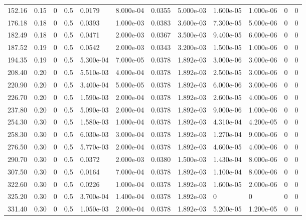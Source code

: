 \documentclass[preview]{standalone}
\begin{document}
{{\begin{tabular}{L{1.2cm}C{1.2cm} C{0.3cm}C{0.5cm} C{1.4cm}C{1.4cm} C{1.4cm}C{1.4cm} C{1.6cm}C{1.6cm} C{1.6cm}C{1.6cm}}
  152.16  &  0.15  & 0     & 0.5 &  0.0179  & 8.000e-04  &  0.0355&   5.000e-03& 1.600e-05 & 1.000e-06   &  0 & 0  \\ 
  176.18  &  0.18  & 0     & 0.5 &  0.0393  & 1.000e-03  &  0.0383&   3.600e-03& 7.300e-05 & 5.000e-06   &  0 & 0  \\ 
  182.49  &  0.18  & 0     & 0.5 &  0.0471  & 2.000e-03  &  0.0367&   3.500e-03& 9.400e-05 & 6.000e-06   &  0 & 0  \\ 
  187.52  &  0.19  & 0     & 0.5 &  0.0542  & 2.000e-03  &  0.0343&   3.200e-03& 1.500e-05 & 1.000e-06   &  0 & 0  \\ 
  194.35  &  0.19  & 0     & 0.5 &  5.300e-04  & 7.000e-05  &  0.0378&   1.892e-03& 3.000e-06 & 3.000e-06   &  0 & 0  \\ 
  208.40  &  0.20  & 0     & 0.5 &  5.510e-03  & 4.000e-04  &  0.0378&   1.892e-03& 2.500e-05 & 3.000e-06   &  0 & 0  \\ 
  220.90  &  0.20  & 0     & 0.5 &  3.400e-04  & 5.000e-05  &  0.0378&   1.892e-03& 6.000e-06 & 3.000e-06   &  0 & 0  \\ 
  226.70  &  0.20  & 0     & 0.5 &  1.590e-03  & 2.000e-04  &  0.0378&   1.892e-03& 2.600e-05 & 4.000e-06   &  0 & 0  \\ 
  237.80  &  0.20  & 0     & 0.5 &  5.090e-03  & 2.000e-04  &  0.0378&   1.892e-03& 9.000e-06 & 1.000e-06   &  0 & 0  \\ 
  254.30  &  0.30  & 0     & 0.5 &  1.580e-03  & 1.000e-04  &  0.0378&   1.892e-03& 4.310e-04 & 4.200e-05   &  0 & 0  \\ 
  258.30  &  0.30  & 0     & 0.5 &  6.030e-03  & 3.000e-04  &  0.0378&   1.892e-03& 1.270e-04 & 9.000e-06   &  0 & 0  \\ 
  276.50  &  0.30  & 0     & 0.5 &  5.770e-03  & 2.000e-04  &  0.0378&   1.892e-03& 4.600e-05 & 4.000e-06   &  0 & 0  \\ 
  290.70  &  0.30  & 0     & 0.5 &  0.0372  & 2.000e-03  &  0.0380&   1.500e-03& 1.430e-04 & 8.000e-06   &  0 & 0  \\ 
  307.50  &  0.30  & 0     & 0.5 &  0.0164  & 7.000e-04  &  0.0378&   1.892e-03& 1.100e-04 & 8.000e-06   &  0 & 0  \\ 
  322.60  &  0.30  & 0     & 0.5 &  0.0226  & 1.000e-04  &  0.0378&   1.892e-03& 1.600e-05 & 2.000e-06   &  0 & 0  \\ 
  325.20  &  0.30  & 0     & 0.5 &  3.700e-04  & 1.400e-04  &  0.0378&   1.892e-03& 0 & 0   &  0 & 0  \\ 
  331.40  &  0.30  & 0     & 0.5 &  1.050e-03  & 2.000e-04  &  0.0378&   1.892e-03& 5.200e-05 & 1.200e-05   &  0 & 0  \\ 

\end{tabular}}}
\end{document}
